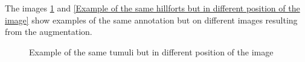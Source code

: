 The images \ref{Example of the same tumuli but in different position of the image} and \ref{Example of the same hillforts but in different position of the image} show examples of the same annotation but on different images resulting from the augmentation.

\begin{figure}[H]
    \centering
    \qquad
    \caption{Example of the same tumuli but in different position of the image}%
    \label{Example of the same tumuli but in different position of the image}
\end{figure}

